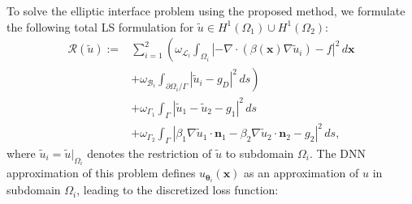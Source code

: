 \documentclass{article}
\begin{document}

To solve the elliptic interface problem using the proposed method, we formulate the following total LS formulation for $\tilde{u} \in H^1(\Omega_1) \cup H^1(\Omega_2)$:
\begin{equation}
    \begin{aligned}
\mathcal{R}(\tilde{u}) := &\sum_{i=1}^{2} \left(\omega_{\mathcal{L}_i} \int_{\Omega_i} \left|-\nabla \cdot (\beta(\boldsymbol{x}) \nabla \tilde{u}_{i}) - f\right|^2 \, d\boldsymbol{x} \right.\\
&\left.+ \omega_{\mathcal{B}_i} \int_{\partial \Omega_i / \Gamma} \left|\tilde{u}_i - g_D\right|^2 \, ds\right) \\
&+ \omega_{\Gamma_1} \int_{\Gamma} \left|\tilde{u}_1 - \tilde{u}_2 - g_1\right|^2 \, ds \\
&+ \omega_{\Gamma_2} \int_{\Gamma} \left|\beta_1 \nabla \tilde{u}_1 \cdot \boldsymbol{n}_1 - \beta_2 \nabla \tilde{u}_2 \cdot \boldsymbol{n}_2 - g_2\right|^2 \, ds,
\end{aligned}
\end{equation}
where $\tilde{u}_i = \tilde{u}|_{\Omega_i}$ denotes the restriction of $\tilde{u}$ to subdomain $\Omega_i$. 
The DNN approximation of this problem defines $u_{\boldsymbol{\theta}_i}(\boldsymbol{x})$ as an approximation of $u$ in subdomain $\Omega_i$, leading to the discretized loss function:
\end{document}
